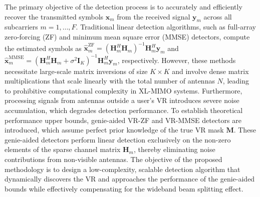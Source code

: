 The primary objective of the detection process is to accurately and efficiently recover the transmitted symbols $\mathbf{x}_m$ from the received signal $\mathbf{y}_m$ across all subcarriers $m = 1, \dots, F$. Traditional linear detection algorithms, such as full-array zero-forcing (ZF) and minimum mean square error (MMSE) detectors, compute the estimated symbols as $\hat{\mathbf{x}}_{m}^{\text{ZF}} = (\mathbf{H}_m^H \mathbf{H}_m)^{-1} \mathbf{H}_m^H \mathbf{y}_m$ and $\hat{\mathbf{x}}_{m}^{\text{MMSE}} = (\mathbf{H}_m^H \mathbf{H}_m + \sigma^2 \mathbf{I}_K)^{-1} \mathbf{H}_m^H \mathbf{y}_m$, respectively. However, these methods necessitate large-scale matrix inversions of size $K \times K$ and involve dense matrix multiplications that scale linearly with the total number of antennas $N$, leading to prohibitive computational complexity in XL-MIMO systems. Furthermore, processing signals from antennas outside a user's VR introduces severe noise accumulation, which degrades detection performance. To establish theoretical performance upper bounds, genie-aided VR-ZF and VR-MMSE detectors are introduced, which assume perfect prior knowledge of the true VR mask $\mathbf{M}$. These genie-aided detectors perform linear detection exclusively on the non-zero elements of the sparse channel matrix $\mathbf{H}_m$, thereby eliminating noise contributions from non-visible antennas. The objective of the proposed methodology is to design a low-complexity, scalable detection algorithm that dynamically discovers the VR and approaches the performance of the genie-aided bounds while effectively compensating for the wideband beam splitting effect.